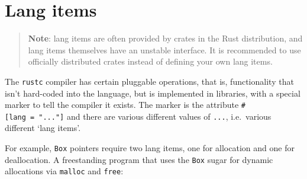 \documentclass[a4paper,]{book}
\begin{document}
\section{Lang items}\label{sec--lang-items}

\begin{quote}
\textbf{Note}: lang items are often provided by crates in the Rust
distribution, and lang items themselves have an unstable interface. It
is recommended to use officially distributed crates instead of defining
your own lang items.
\end{quote}

The \texttt{rustc} compiler has certain pluggable operations, that is,
functionality that isn't hard-coded into the language, but is
implemented in libraries, with a special marker to tell the compiler it
exists. The marker is the attribute \texttt{\#{[}lang\ =\ "..."{]}} and
there are various different values of \texttt{...}, i.e.~various
different `lang items'.

For example, \texttt{Box} pointers require two lang items, one for
allocation and one for deallocation. A freestanding program that uses
the \texttt{Box} sugar for dynamic allocations via \texttt{malloc} and
\texttt{free}:
\end{document}

